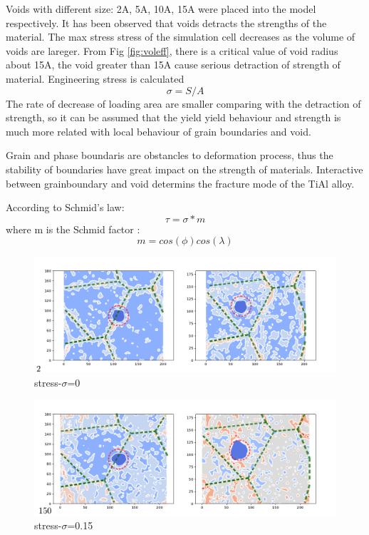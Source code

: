 \documentclass[times,12pt]{elsarticle}
\begin{document}
Voids with different size: 2A, 5A, 10A, 15A were placed into the model respectively. It has been observed that  voids detracts the strengths of the material. The max stress stress of the simulation cell decreases as the volume of voids are lareger. From Fig \ref{fig:voleff}, there is a critical value of void radius about 15A, the void greater than 15A cause serious detraction of strength of material. 
Engineering stress is calculated
$$ \sigma = S/A$$
The rate of decrease of loading area are smaller comparing with the detraction of strength, so it can be assumed that the yield yield behaviour and strength is much more related with local behaviour of grain boundaries and void.

Grain and phase boundaris are obstancles to deformation process, thus the stability of boundaries have great impact on the strength of materials. Interactive between grainboundary and void determins the fracture mode of the TiAl alloy.

According to Schmid's law:
$$\tau = \sigma*m$$
where m is the Schmid factor :
$$ m = cos(\phi)cos(\lambda)$$
\begin{figure}[h]
	\centering
	\includegraphics[width=0.7\linewidth]{img/frame2}
	\caption{stress-$\sigma$=0}
	\label{ }
\end{figure}

\begin{figure}[h]
	\centering
	\includegraphics[width=0.7\linewidth]{img/frame150}
	\caption{stress-$\sigma$=0.15}
	\label{ }
\end{figure}
\end{document}
